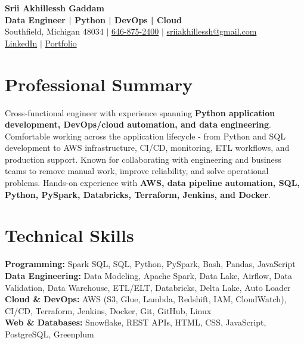 \documentclass[letterpaper,10pt]{article}
\begin{document}
\fontsize{9.35pt}{10.45pt}\selectfont

\begin{center}
    {\LARGE \textbf{Srii Akhillessh Gaddam}} \\[-1pt]
    \textbf{Data Engineer | Python | DevOps | Cloud} \\[2pt]
    Southfield, Michigan 48034 $|$
    \href{tel:6468752400}{646-875-2400} $|$
    \href{mailto:sriiakhillessh@gmail.com}{sriiakhillessh@gmail.com} \\[1pt]
    \href{https://www.linkedin.com/in/srii-akhiilessh-gaddam-b48668191/}{LinkedIn} $|$
    \href{https://sriiakhillesshg.github.io/portfolio/}{Portfolio}
\end{center}
\vspace{-8pt}

\section{Professional Summary}
\small{Cross-functional engineer with experience spanning \textbf{Python application development, DevOps/cloud automation, and data engineering}. Comfortable working across the application lifecycle - from Python and SQL development to AWS infrastructure, CI/CD, monitoring, ETL workflows, and production support. Known for collaborating with engineering and business teams to remove manual work, improve reliability, and solve operational problems. Hands-on experience with \textbf{AWS, data pipeline automation, SQL, Python, PySpark, Databricks, Terraform, Jenkins, and Docker}.}

\section{Technical Skills}
\small{
\textbf{Programming:} Spark SQL, SQL, Python, PySpark, Bash, Pandas, JavaScript \\
\textbf{Data Engineering:} Data Modeling, Apache Spark, Data Lake, Airflow, Data Validation, Data Warehouse, ETL/ELT, Databricks, Delta Lake, Auto Loader \\
\textbf{Cloud \& DevOps:} AWS (S3, Glue, Lambda, Redshift, IAM, CloudWatch), CI/CD, Terraform, Jenkins, Docker, Git, GitHub, Linux \\
\textbf{Web \& Databases:} Snowflake, REST APIs, HTML, CSS, JavaScript, PostgreSQL, Greenplum
}
\end{document}
